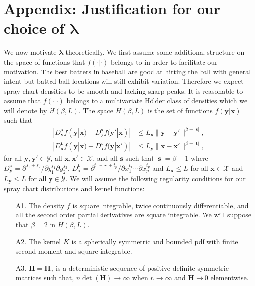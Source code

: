 \documentclass[12pt]{article}
\newcommand{\Y}{\mathcal{Y}}
\newcommand{\X}{\mathcal{X}}
\newcommand{\Hbf}{\textbf{H}}
\newcommand{\y}{\textbf{y}}
\newcommand{\x}{\textbf{x}}
\newcommand{\s}{\textbf{s}}
\newcommand{\tbf}{\textbf{t}}
\newcommand{\lambdabf}{\boldsymbol{\lambda}}
\begin{document}





\section*{Appendix: Justification for our choice of $\lambdabf$}

We now motivate $\lambdabf$ theoretically. We first assume some additional structure on the space of functions that $f(\cdot|\cdot)$ belongs to in order to facilitate our motivation. The best batters in baseball are good at hitting the ball with general intent but batted ball locations will still exhibit variation. Therefore we expect spray chart densities to be smooth and lacking sharp peaks. It is reasonable to assume that $f(\cdot|\cdot)$ belongs to a multivariate H{\"o}lder class of densities which we will denote by $H(\beta,L)$. The space $H(\beta,L)$ is the set of functions $f(\y|\x)$ such that
\begin{align*}
|D_{\y}^\s f(\y|\x) - D_{\y}^\s f(\y'|\x)| &\leq L_\x\|\y - \y'\|^{\beta - |\s|}, \\
|D_{\x}^\tbf f(\y|\x) - D_{\x}^\tbf f(\y|\x')| &\leq L_\y\|\x - \x'\|^{\beta - |\tbf|},
\end{align*}
for all $\y,\y' \in \Y$, all $\x,\x' \in \X$, and all $\s$ such that $|\s| = \beta - 1$ where
$D_{\y}^\s = \partial^{s_1 + s_2}/\partial y_1^{s_1} \partial y_2^{s_2}$,
$D_{\x}^\tbf = \partial^{t_1 + \cdots + t_p}/\partial x_1^{t_1} \cdots \partial x_p^{t_p}$ and $L_\x \leq L$ for all $\x \in \X$ and $L_\y \leq L$ for all $\y \in \Y$.
We will assume the following regularity conditions for our spray chart distributions and kernel functions:

\begin{itemize}
\item[A1.] The density $f$ is square integrable, twice continuously differentiable, and all the second order partial derivatives are square integrable. We will suppose that $\beta = 2$ in $H(\beta,L)$.
\item[A2.] The kernel $K$ is a spherically symmetric and bounded pdf with finite second moment and square integrable.
\item[A3.] $\Hbf = \Hbf_n$ is a deterministic sequence of positive definite symmetric matrices such that, $n\det(\Hbf) \to \infty$ when $n \to \infty$ and $\Hbf \to 0$ elementwise.
\end{itemize}
\end{document}
